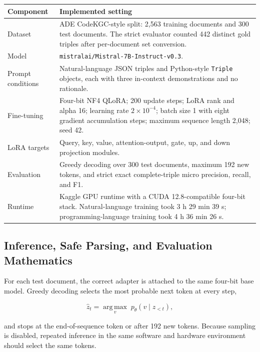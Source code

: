 \documentclass[11pt]{article}
\begin{document}
{
\small
\begin{longtable}[]{@{}
  >{\raggedright\arraybackslash}p{}
  >{\raggedright\arraybackslash}p{}@{}}
\toprule\noalign{}
\textbf{Component} & \textbf{Implemented setting} \\
\midrule\noalign{}
\endhead
\bottomrule\noalign{}
\endlastfoot
Dataset & ADE CodeKGC-style split: 2,563 training documents and 300 test
documents. The strict evaluator counted 442 distinct gold triples after
per-document set conversion. \\
Model & \texttt{mistralai/Mistral-7B-Instruct-v0.3}. \\
Prompt conditions & Natural-language JSON triples and Python-style
\texttt{Triple} objects, each with three in-context demonstrations and no
rationale. \\
Fine-tuning & Four-bit NF4 QLoRA; 200 update steps; LoRA rank and alpha
16; learning rate $2\times10^{-4}$; batch size 1 with eight gradient
accumulation steps; maximum sequence length 2,048; seed 42. \\
LoRA targets & Query, key, value, attention-output, gate, up, and down
projection modules. \\
Evaluation & Greedy decoding over 300 test documents, maximum 192 new
tokens, and strict exact complete-triple micro precision, recall, and F1. \\
Runtime & Kaggle GPU runtime with a CUDA 12.8-compatible four-bit stack.
Natural-language training took 3 h 29 min 39 s; programming-language
training took 4 h 36 min 26 s. \\
\end{longtable}
\normalsize
}

\begin{minipage}{\textwidth}
\subsection{Inference, Safe Parsing, and Evaluation Mathematics}
\label{inference-safe-parsing-and-evaluation-mathematics}

For each test document, the correct adapter is attached to the same
four-bit base model. Greedy decoding selects the most probable next token
at every step,
\end{minipage}

\[
\hat{z}_t = \underset{v}{\operatorname{arg\,max}}\;
p_{\theta}(v\mid z_{<t}),
\]

and stops at the end-of-sequence token or after 192 new tokens. Because
sampling is disabled, repeated inference in the same software and
hardware environment should select the same tokens.
\end{document}
